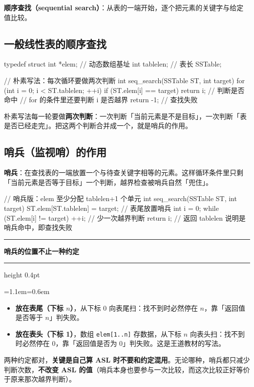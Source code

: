 \documentclass[11pt,openany,UTF8]{ctexbook}
\newcommand{\callouthead}[2]{%
  \par\addvspace{7pt}\noindent
  {\color{#1}\rule[-0.15em]{3pt}{1.05em}}\hspace{0.5em}%
  {\bfseries\color{#1}#2}\par\nobreak\vspace{-0.35em}%
  {\color{rulesep}\hrule height 0.4pt}\nobreak\vspace{0.45em}%
  \begingroup\small\setlength{\parindent}{0pt}%
  \leftskip=1.1em\rightskip=0.6em\noindent\ignorespaces}
\newcommand{\calloutend}{\par\endgroup\addvspace{7pt}}
\newenvironment{callwarn}[1]{\callouthead{warnbar}{#1}}{\calloutend}
\begin{document}
\textbf{顺序查找（sequential search）}：从表的一端开始，逐个把元素的关键字与给定值比较。

\subsection{一般线性表的顺序查找}

\begin{codebox}
typedef struct {
    int *elem;      // 动态数组基址
    int tablelen;   // 表长
} SSTable;

// 朴素写法：每次循环要做两次判断
int seq_search(SSTable ST, int target) {
    for (int i = 0; i < ST.tablelen; ++i) {
        if (ST.elem[i] == target) return i;   // 判断是否命中
        // for 的条件里还要判断 i 是否越界
    }
    return -1;   // 查找失败
}
\end{codebox}

朴素写法每一轮要做\textbf{两次判断}：一次判断「当前元素是不是目标」，一次判断「表是否已经走完」。把这两个判断合并成一个，就是哨兵的作用。

\subsection{哨兵（监视哨）的作用}

\textbf{哨兵}：在查找表的一端放置一个与待查关键字相等的元素。这样循环条件里只剩「当前元素是否等于目标」一个判断，越界检查被哨兵自然「兜住」。

\begin{codebox}
// 哨兵版：elem 至少分配 tablelen+1 个单元
int seq_search(SSTable ST, int target) {
    ST.elem[ST.tablelen] = target;   // 表尾放置哨兵
    int i = 0;
    while (ST.elem[i] != target) ++i; // 少一次越界判断
    return i;   // 返回 tablelen 说明是哨兵命中，即查找失败
}
\end{codebox}

\begin{callwarn}{哨兵的位置不止一种约定}
\begin{itemize}
\item \textbf{放在表尾（下标 $n$）}，从下标 0 向表尾扫：找不到时必然停在 $n$，靠「返回值是否等于 $n$」判失败。
\item \textbf{放在表头（下标 1）}，数组 \texttt{elem[1..n]\allowbreak{}} 存数据，从下标 $n$ 向表头扫：找不到时必然停在 0，靠「返回值是否为 0」判失败。这是王道教材的写法。
\end{itemize}
两种约定都对，\textbf{关键是自己算 ASL 时不要和约定混用}。无论哪种，哨兵都只减少判断次数，\textbf{不改变 ASL 的值}（哨兵本身也要参与一次比较，而这次比较正好等价于原来那次越界判断）。

\end{callwarn}
\end{document}
